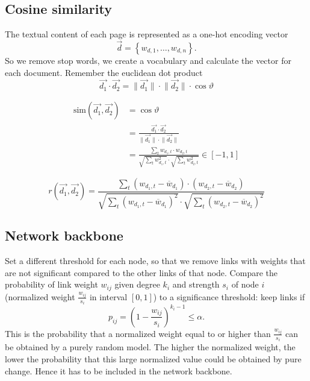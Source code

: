 \documentclass[a4paper,9pt]{extarticle}
\begin{document}
\begin{multicols*}{2}
		\subsection{Cosine similarity}
		The textual content of each page is represented as a one-hot encoding vector
		\begin{equation*}
			\vec{d}=\left\{w_{d,1},\ldots,w_{d,n}\right\}.
		\end{equation*}
		So we remove stop words, we create a vocabulary and calculate the vector for each document. Remember the euclidean dot product
		\begin{equation*}
			\vec{d_{1}}\cdot\vec{d_{2}}=\lVert\vec{d_{1}}\rVert\cdot\lVert\vec{d_{2}}\rVert\cdot\cos\vartheta
		\end{equation*}
		\begin{riquadro}
			\begin{align*}
				\mathrm{sim}\left(\vec{d_{1}},\vec{d_{2}}\right)&=\cos\vartheta\\	
				&=\frac{\vec{d_{1}}\cdot\vec{d_{2}}}{\lVert\vec{d_{1}}\rVert\cdot\lVert\vec{d_{2}}\rVert}\\
				&=\frac{\sum_{t}w_{d_{1},t}\cdot w_{d_{2},t}}{\sqrt{\sum_{t}w^{2}_{d_{1},t}}\cdot\sqrt{\sum_{t}w^{2}_{d_{2},t}}}\in[-1,1]
			\end{align*}
		\end{riquadro}
		\begin{riquadro}
				\begin{equation*}
				r\left(\vec{d_{1}},\vec{d_{2}}\right)=\frac{\sum_{t}\left(w_{d_{1},t}-\overline{w}_{d_{1}}\right)\cdot\left(w_{d_{2},t}-\overline{w}_{d_{2}}\right)}{\sqrt{\sum_{t}\left(w_{d_{1},t}-\overline{w}_{d_{1}}\right)^{2}}\cdot\sqrt{\sum_{t}\left(w_{d_{2},t}-\overline{w}_{d_{2}}\right)^{2}}}
			\end{equation*}
		\end{riquadro}
		\subsection{Network backbone}
		Set a different threshold for each
		node, so that we remove links with weights
		that are not significant compared to the other
		links of that node. Compare the probability of link weight $w_{ij}$ given degree $k_{i}$ and strength $s_{i}$ of node $i$ (normalized weight $\frac{w_{ij}}{s_{i}}$ in interval $[0,1]$) to a significance threshold: keep links if
		\begin{equation*}
			p_{ij}=\left(1-\frac{w_{ij}}{s_{i}}\right)^{k_{i}-1}\leq\alpha.
		\end{equation*}
		This is the probability that a normalized weight equal to or higher than $\frac{w_{ij}}{s_{i}}$ can be obtained by a purely random model. The higher the normalized weight, the lower the probability that this large normalized value could be obtained by pure change. Hence it has to be included in the network backbone.

\end{multicols*}
\end{document}
